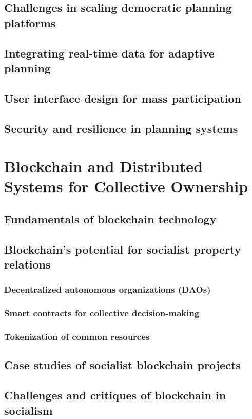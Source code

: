 \subsection{Challenges in scaling democratic planning platforms}
\subsection{Integrating real-time data for adaptive planning}
\subsection{User interface design for mass participation}
\subsection{Security and resilience in planning systems}

\newpage

\section{Blockchain and Distributed Systems for Collective Ownership}
\subsection{Fundamentals of blockchain technology}
\subsection{Blockchain's potential for socialist property relations}
\subsubsection{Decentralized autonomous organizations (DAOs)}
\subsubsection{Smart contracts for collective decision-making}
\subsubsection{Tokenization of common resources}
\subsection{Case studies of socialist blockchain projects}
\subsection{Challenges and critiques of blockchain in socialism}
